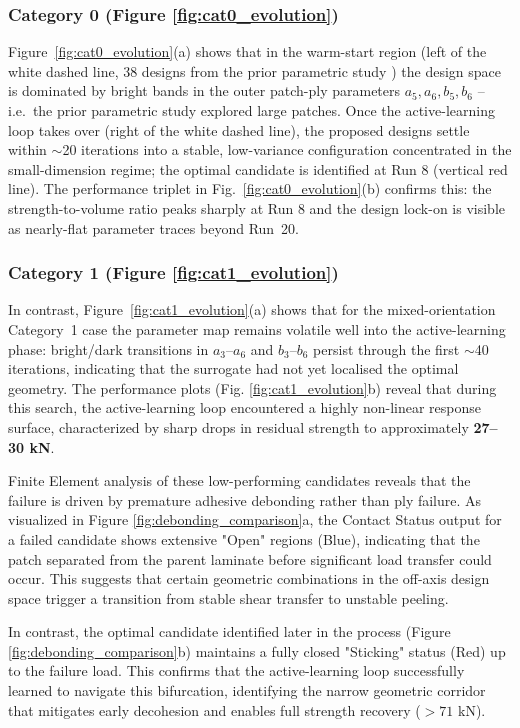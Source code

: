 \documentclass[
  preprint,
  12pt,
  a4paper
]{elsarticle}
\newcommand{\new}[1]{#1}
\begin{document}
\subsubsection{Category 0 (Figure \ref{fig:cat0_evolution})}
\new{Figure~\ref{fig:cat0_evolution}(a) shows that in the warm-start region (left of the white dashed line, 38 designs from the prior parametric study \cite{psarras2024design}) the design space is dominated by bright bands in the outer patch-ply parameters $a_5, a_6, b_5, b_6$ -- i.e.\ the prior parametric study explored large patches. Once the active-learning loop takes over (right of the white dashed line), the proposed designs settle within $\sim$20 iterations into a stable, low-variance configuration concentrated in the small-dimension regime; the optimal candidate is identified at Run 8 (vertical red line). The performance triplet in Fig.~\ref{fig:cat0_evolution}(b) confirms this: the strength-to-volume ratio peaks sharply at Run 8 and the design lock-on is visible as nearly-flat parameter traces beyond Run~20.}

\subsubsection{Category 1 (Figure \ref{fig:cat1_evolution})}
\new{In contrast, Figure~\ref{fig:cat1_evolution}(a) shows that for the mixed-orientation Category~1 case the parameter map remains volatile well into the active-learning phase: bright/dark transitions in $a_3$--$a_6$ and $b_3$--$b_6$ persist through the first $\sim$40 iterations, indicating that the surrogate had not yet localised the optimal geometry.} The performance plots (Fig. \ref{fig:cat1_evolution}b) reveal that during this search, the \new{active-learning loop} encountered a highly non-linear response surface, characterized by sharp drops in residual strength to approximately \textbf{27--30 kN}.

Finite Element analysis of these low-performing candidates reveals that the failure is driven by premature adhesive debonding rather than ply failure. As visualized in Figure \ref{fig:debonding_comparison}a, the Contact Status output for a failed candidate shows extensive "Open" regions (Blue), indicating that the patch separated from the parent laminate before significant load transfer could occur. This suggests that certain geometric combinations in the off-axis design space trigger a transition from stable shear transfer to unstable peeling. 

In contrast, the optimal candidate identified later in the process (Figure \ref{fig:debonding_comparison}b) maintains a fully closed "Sticking" status (Red) up to the failure load. This confirms that the \new{active-learning loop} successfully learned to navigate this bifurcation, identifying the narrow geometric corridor that mitigates early decohesion and enables full strength recovery ($>71$ kN).
\end{document}
